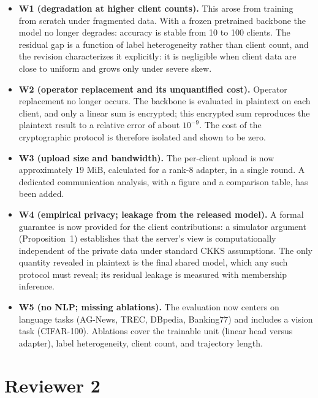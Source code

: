 \documentclass[11pt]{article}
\begin{document}
\begin{itemize}
\item \textbf{W1 (degradation at higher client counts).} This arose from training from scratch under
fragmented data. With a frozen pretrained backbone the model no longer degrades: accuracy is stable from 10
to 100 clients. The residual gap is a function of label heterogeneity rather than client count, and the
revision characterizes it explicitly: it is negligible when client data are close to uniform and grows only
under severe skew.

\item \textbf{W2 (operator replacement and its unquantified cost).} Operator replacement no longer occurs.
The backbone is evaluated in plaintext on each client, and only a linear sum is encrypted; this encrypted sum
reproduces the plaintext result to a relative error of about $10^{-9}$. The cost of the cryptographic
protocol is therefore isolated and shown to be zero.

\item \textbf{W3 (upload size and bandwidth).} The per-client upload is now approximately 19 MiB, calculated
for a rank-8 adapter, in a single round. A dedicated communication analysis, with a figure and a comparison
table, has been added.

\item \textbf{W4 (empirical privacy; leakage from the released model).} A formal guarantee is now provided
for the client contributions: a simulator argument (Proposition~1) establishes that the server's view is
computationally independent of the private data under standard CKKS assumptions. The only quantity revealed
in plaintext is the final shared model, which any such protocol must reveal; its residual leakage is measured
with membership inference.

\item \textbf{W5 (no NLP; missing ablations).} The evaluation now centers on language tasks (AG-News, TREC,
DBpedia, Banking77) and includes a vision task (CIFAR-100). Ablations cover the trainable unit (linear head
versus adapter), label heterogeneity, client count, and trajectory length.
\end{itemize}

\section*{Reviewer 2}
\end{document}
